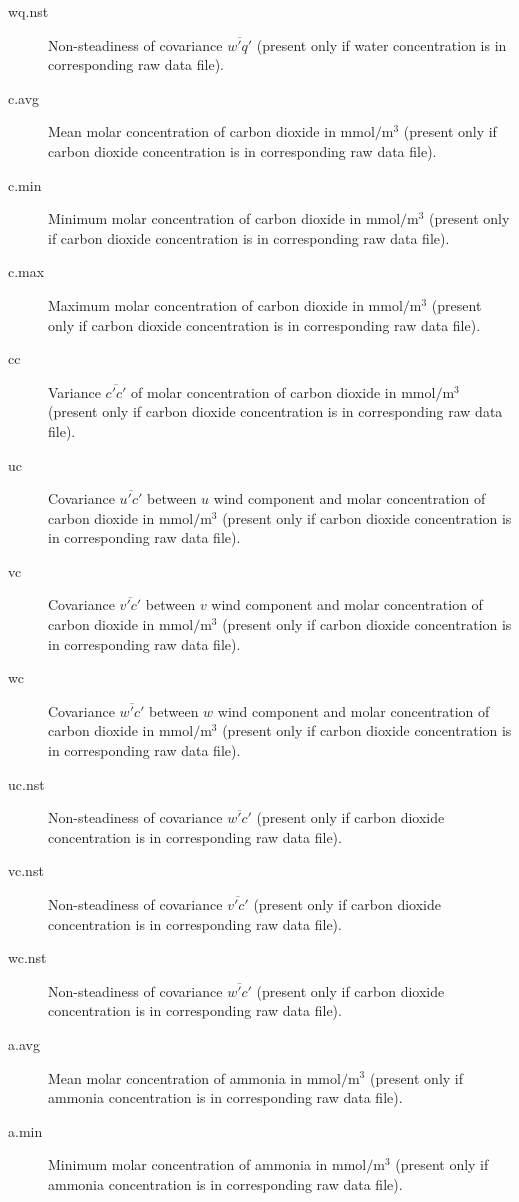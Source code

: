 \documentclass[a4paper,10pt]{book}
\begin{document}
\begin{description}
 \item[wq.nst] Non-steadiness of covariance $\overline{w'q'}$ (present only if water concentration is in corresponding raw data file).
 \item[c.avg] Mean molar concentration of carbon dioxide in $\mbox{mmol}/\mbox{m}^{3}$ (present only if carbon dioxide concentration is in corresponding raw data file).
 \item[c.min] Minimum molar concentration of carbon dioxide in $\mbox{mmol}/\mbox{m}^{3}$ (present only if carbon dioxide concentration is in corresponding raw data file).
 \item[c.max] Maximum molar concentration of carbon dioxide in $\mbox{mmol}/\mbox{m}^{3}$ (present only if carbon dioxide concentration is in corresponding raw data file).
 \item[cc] Variance $\overline{c'c'}$ of molar concentration of carbon dioxide in $\mbox{mmol}/\mbox{m}^{3}$ (present only if carbon dioxide concentration is in corresponding raw data file).
 \item[uc] Covariance $\overline{u'c'}$ between $u$ wind component and molar concentration of carbon dioxide in $\mbox{mmol}/\mbox{m}^{3}$ (present only if carbon dioxide concentration is in corresponding raw data file).
 \item[vc] Covariance $\overline{v'c'}$ between $v$ wind component and molar concentration of carbon dioxide in $\mbox{mmol}/\mbox{m}^{3}$ (present only if carbon dioxide concentration is in corresponding raw data file).
 \item[wc] Covariance $\overline{w'c'}$ between $w$ wind component and molar concentration of carbon dioxide in $\mbox{mmol}/\mbox{m}^{3}$ (present only if carbon dioxide concentration is in corresponding raw data file).
 \item[uc.nst] Non-steadiness of covariance $\overline{w'c'}$ (present only if carbon dioxide concentration is in corresponding raw data file).
 \item[vc.nst] Non-steadiness of covariance $\overline{v'c'}$ (present only if carbon dioxide concentration is in corresponding raw data file).
 \item[wc.nst] Non-steadiness of covariance $\overline{w'c'}$ (present only if carbon dioxide concentration is in corresponding raw data file).
 \item[a.avg] Mean molar concentration of ammonia in $\mbox{mmol}/\mbox{m}^{3}$ (present only if ammonia concentration is in corresponding raw data file).
 \item[a.min] Minimum molar concentration of ammonia in $\mbox{mmol}/\mbox{m}^{3}$ (present only if ammonia concentration is in corresponding raw data file).

\end{description}
\end{document}
